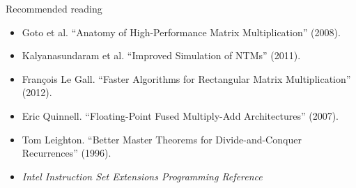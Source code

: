 \documentclass[mathserif,xcolor={dvipsnames,table}]{beamer}
\begin{document}
%

\begin{frame}{Recommended reading}
\tiny{
\begin{itemize}
\item Goto et al. ``Anatomy of High-Performance Matrix Multiplication'' (2008).
\item Kalyanasundaram et al. ``Improved Simulation of NTMs'' (2011).
\item Fran\c{c}ois Le Gall. ``Faster Algorithms for Rectangular Matrix Multiplication'' (2012).
\item Eric Quinnell. ``Floating-Point Fused Multiply-Add Architectures'' (2007).
\item Tom Leighton. ``Better Master Theorems for Divide-and-Conquer Recurrences'' (1996).
\item \textit{Intel Instruction Set Extensions Programming Reference}
\end{itemize}
}
\end{frame}

\end{document}

